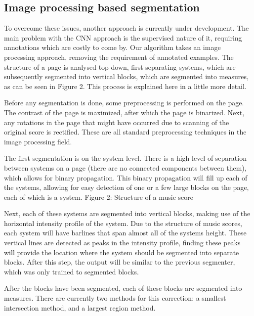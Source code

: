\subsection{Image processing based segmentation}
To overcome these issues, another approach is currently under development. The main problem with the CNN approach is the supervised nature of it, requiring annotations which are costly to come by. Our algorithm takes an image processing approach, removing the requirement of annotated examples. The structure of a page is analysed top-down, first separating systems, which are subsequently segmented into vertical blocks, which are segmented into measures, as can be seen in Figure 2. This process is explained here in a little more detail.

Before any segmentation is done, some preprocessing is performed on the page. The contrast of the page is maximized, after which the page is binarized. Next, any rotations in the page that might have occurred due to scanning of the original score is rectified. These are all standard preprocessing techniques in the image processing field.

The first segmentation is on the system level. There is a high level of separation between systems on a page (there are no connected components between them), which allows for binary propagation. This binary propagation will fill up each of the systems, allowing for easy detection of one or a few large blocks on the page, each of which is a system.
Figure 2: Structure of a music score

Next, each of these systems are segmented into vertical blocks, making use of the horizontal intensity profile of the system. Due to the structure of music scores, each system will have barlines that span almost all of the systems height. These vertical lines are detected as peaks in the intensity profile, finding these peaks will provide the location where the system should be segmented into separate blocks. After this step, the output will be similar to the previous segmenter, which was only trained to segmented blocks.

After the blocks have been segmented, each of these blocks are segmented into measures. There are currently two methods for this correction: a smallest intersection method, and a largest region method.

